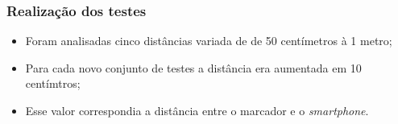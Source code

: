 \documentclass{beamer}
\begin{document}
	\begin{frame}
		\frametitle{Realização dos testes}
		\begin{itemize}
		  \item Foram analisadas cinco distâncias variada de de 50 centímetros à 1 metro;
		  \item Para cada novo conjunto de testes a distância era aumentada em 10 centímtros;
		  \item Esse valor correspondia a distância entre o marcador e o \emph{smartphone}. 
		\end{itemize}
		
	\end{frame}
	
	
	
	
\end{document}
